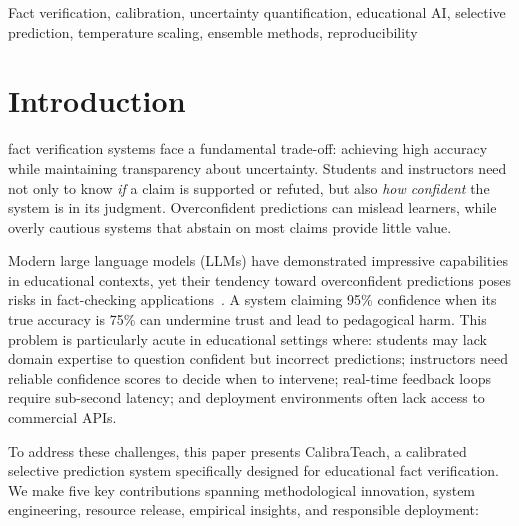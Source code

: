 Fact verification, calibration, uncertainty quantification, educational AI, selective prediction, temperature scaling, ensemble methods, reproducibility

\section{Introduction}\label{introduction}

fact verification systems face a fundamental trade-off: achieving high accuracy while maintaining transparency about uncertainty. Students and instructors need not only to know \emph{if} a claim is supported or refuted, but also \emph{how confident} the system is in its judgment. Overconfident predictions can mislead learners, while overly cautious systems that abstain on most claims provide little value.

Modern large language models (LLMs) have demonstrated impressive capabilities in educational contexts, yet their tendency toward overconfident predictions poses risks in fact-checking applications~. A system claiming 95\% confidence when its true accuracy is 75\% can undermine trust and lead to pedagogical harm. This problem is particularly acute in educational settings where: students may lack domain expertise to question confident but incorrect predictions; instructors need reliable confidence scores to decide when to intervene; real-time feedback loops require sub-second latency; and deployment environments often lack access to commercial APIs.

To address these challenges, this paper presents CalibraTeach, a calibrated selective prediction system specifically designed for educational fact verification. We make five key contributions spanning methodological innovation, system engineering, resource release, empirical insights, and responsible deployment:

